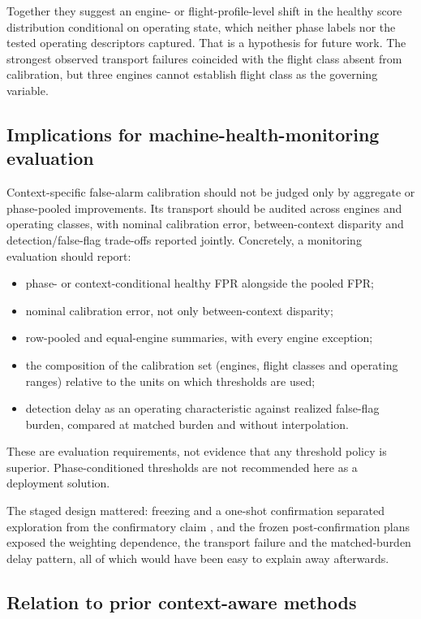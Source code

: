 \documentclass[preprint,11pt,a4paper]{elsarticle}
\begin{document}
Together they suggest an engine- or flight-profile-level shift in the healthy score distribution conditional on operating state, which neither phase labels nor the tested operating descriptors captured. That is a hypothesis for future work. The strongest observed transport failures coincided with the flight class absent from calibration, but three engines cannot establish flight class as the governing variable.

\subsection{Implications for machine-health-monitoring evaluation}

Context-specific false-alarm calibration should not be judged only by aggregate or phase-pooled improvements. Its transport should be audited across engines and operating classes, with nominal calibration error, between-context disparity and detection/false-flag trade-offs reported jointly. Concretely, a monitoring evaluation should report:
\begin{itemize}
\item phase- or context-conditional healthy FPR alongside the pooled FPR;
\item nominal calibration error, not only between-context disparity;
\item row-pooled and equal-engine summaries, with every engine exception;
\item the composition of the calibration set (engines, flight classes and operating ranges) relative to the units on which thresholds are used;
\item detection delay as an operating characteristic against realized false-flag burden, compared at matched burden and without interpolation.
\end{itemize}

These are evaluation requirements, not evidence that any threshold policy is superior. Phase-conditioned thresholds are not recommended here as a deployment solution.

The staged design mattered: freezing and a one-shot confirmation separated exploration from the confirmatory claim \cite{N33}, and the frozen post-confirmation plans exposed the weighting dependence, the transport failure and the matched-burden delay pattern, all of which would have been easy to explain away afterwards.

\subsection{Relation to prior context-aware methods}
\end{document}
